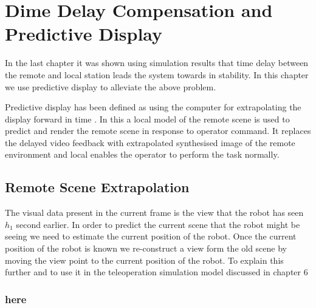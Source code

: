 \chapter{Dime Delay Compensation and Predictive Display}
\label{ch_7:PDsply}
In the last chapter it was shown using simulation results that time delay between the remote and local station leads the system towards in stability. In this chapter we use predictive display to alleviate the above problem.


Predictive display has been defined as using the computer for extrapolating the display forward in time \cite{sheridan}. In this a local model of the remote scene is used to predict and render the remote scene in response to operator command. It replaces the delayed video feedback with extrapolated synthesised  image of the remote environment and local enables the operator to perform the task normally. 

\section{Remote Scene Extrapolation} 
The visual data present in the current frame is the view that the robot has seen $h_1$ second earlier. In order to predict the current scene that the robot might be seeing we need to estimate the current position of the robot. Once the current position of the robot is known we re-construct a view form the old scene by moving the view point to the current position of the robot. To explain this further and to use it in the teleoperation simulation model discussed in chapter 6
\subsection{here}

